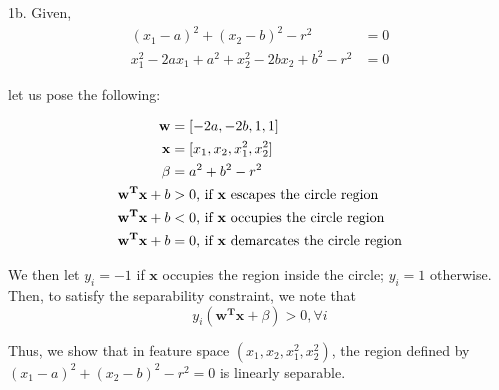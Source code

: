 \documentclass{article}
\begin{document}
1b. Given,
\begin{align*}
(x_{1}-a)^{2}+(x_{2}-b)^{2}-r^{2} &= 0\\
x_{1}^{2}-2ax_{1}+a^{2}+x_{2}^{2}-2bx_{2}+b^{2}-r^{2} &= 0
\end{align*}

let us pose the following:

\begin{align*}
  \mathbf{w} &= [-2a, -2b, 1, 1]\\
  \mathbf{x} &= [x_1, x_2, x_1^2, x_2^2]\\
  \beta &= a^2+b^2-r^2\\
  \mathbf{w^Tx} + b &> 0 \textnormal{, if } \mathbf{x} \textnormal{ escapes the circle region}\\
  \mathbf{w^Tx} + b &< 0 \textnormal{, if } \mathbf{x} \textnormal{ occupies the circle region}\\
  \mathbf{w^Tx} + b &= 0 \textnormal{, if } \mathbf{x} \textnormal{ demarcates the circle region}\\
\end{align*}

We then let \(y_i = -1\) if \(\mathbf{x}\) occupies the region inside the circle;
\(y_i = 1\) otherwise. Then, to satisfy the separability constraint, we note that
\begin{equation*}
  y_i(\mathbf{w^Tx}+\beta) > 0, \forall i
\end{equation*}

Thus, we show that in feature space \((x_1, x_2, x_1^2, x_2^2)\), the region defined by \((x_{1}-a)^{2}+(x_{2}-b)^{2}-r^{2} = 0\) is linearly separable.
\end{document}
